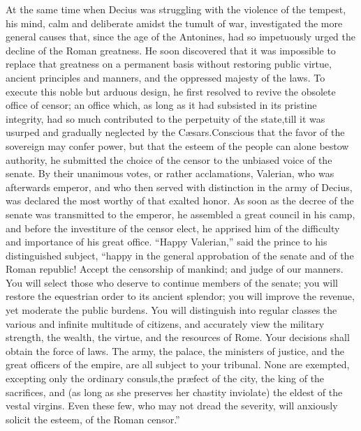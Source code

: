 


At the same time when Decius was struggling with the violence of
the tempest, his mind, calm and deliberate amidst the tumult of
war, investigated the more general causes that, since the age of
the Antonines, had so impetuously urged the decline of the Roman
greatness. He soon discovered that it was impossible to replace
that greatness on a permanent basis without restoring public
virtue, ancient principles and manners, and the oppressed majesty
of the laws. To execute this noble but arduous design, he first
resolved to revive the obsolete office of censor; an office
which, as long as it had subsisted in its pristine integrity, had
so much contributed to the perpetuity of the state,\footnotemark[37] till it
was usurped and gradually neglected by the Cæsars.\footnotemark[38] Conscious
that the favor of the sovereign may confer power, but that the
esteem of the people can alone bestow authority, he submitted the
choice of the censor to the unbiased voice of the senate. By
their unanimous votes, or rather acclamations, Valerian, who was
afterwards emperor, and who then served with distinction in the
army of Decius, was declared the most worthy of that exalted
honor. As soon as the decree of the senate was transmitted to the
emperor, he assembled a great council in his camp, and before the
investiture of the censor elect, he apprised him of the
difficulty and importance of his great office. “Happy Valerian,”
said the prince to his distinguished subject, “happy in the
general approbation of the senate and of the Roman republic!
Accept the censorship of mankind; and judge of our manners. You
will select those who deserve to continue members of the senate;
you will restore the equestrian order to its ancient splendor;
you will improve the revenue, yet moderate the public burdens.
You will distinguish into regular classes the various and
infinite multitude of citizens, and accurately view the military
strength, the wealth, the virtue, and the resources of Rome. Your
decisions shall obtain the force of laws. The army, the palace,
the ministers of justice, and the great officers of the empire,
are all subject to your tribunal. None are exempted, excepting
only the ordinary consuls,\footnotemark[39] the præfect of the city, the king
of the sacrifices, and (as long as she preserves her chastity
inviolate) the eldest of the vestal virgins. Even these few, who
may not dread the severity, will anxiously solicit the esteem, of
the Roman censor.”\footnotemark[40]


